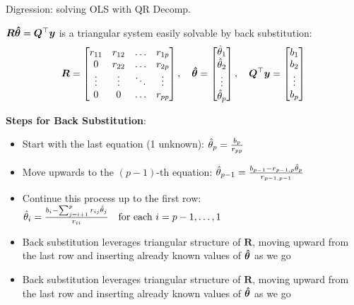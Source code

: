 \documentclass[11pt,compress,t,notes=noshow, xcolor=table]{beamer}
\begin{document}
\begin{framei}[fs=small]{Digression: solving OLS with QR Decomp.}
\item $\bm{R} \bm{\hat\theta} = \bm{Q}^{\top} \bm{y}$ is a triangular system easily solvable by back substitution:
$$
\bm{R} = \begin{bmatrix} 
r_{11} & r_{12} & \dots & r_{1p} \\ 
0 & r_{22} & \dots & r_{2p} \\ 
\vdots & \vdots & \ddots & \vdots \\ 
0 & 0 & \dots & r_{pp} 
\end{bmatrix}, \quad 
\bm{\hat\theta} = \begin{bmatrix} 
\hat{\theta}_1 \\ 
\hat{\theta}_2 \\ 
\vdots \\ 
\hat{\theta}_p 
\end{bmatrix}, \quad \bm{Q}^{\top} \bm{y} = \begin{bmatrix} 
b_1 \\ 
b_2 \\ 
\vdots \\ 
b_p 
\end{bmatrix}
$$
\vfill
\item \textbf{Steps for Back Substitution}:
\begin{itemize}
\item Start with the last equation (1 unknown):
$
\hat{\theta}_p = \frac{b_p}{r_{pp}}
$
\item Move upwards to the \( (p-1) \)-th equation:
$
\hat{\theta}_{p-1} = \frac{b_{p-1} - r_{p-1,p} \hat{\theta}_p}{r_{p-1,p-1}}
$
\item Continue this process up to the first row:
$
\hat{\theta}_i = \frac{b_i - \sum_{j=i+1}^p r_{ij} \hat{\theta}_j}{r_{ii}} \quad \text{for each } i = p-1, \dots, 1
$
\vfill
\item Back substitution leverages triangular structure of $\bm{R}$, moving upward from the last row and inserting already known values of $\bm{\hat\theta}$ as we go
\item[] Back substitution leverages triangular structure of $\bm{R}$, moving upward from the last row and inserting already known values of $\bm{\hat\theta}$ as we go
\end{itemize}
\end{framei}
\end{document}
